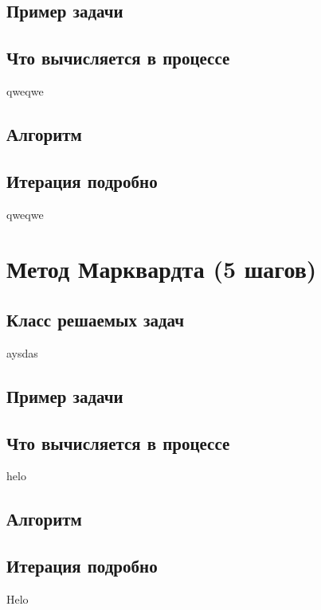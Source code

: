 \subsection{Пример задачи} %

\subsection{Что вычисляется в процессе}
qweqwe

\subsection{Алгоритм} %

\subsection{Итерация подробно} %
qweqwe

\section{Метод Марквардта (5 шагов)}

\subsection{Класс решаемых задач} %
aysdas

\subsection{Пример задачи} %

\subsection{Что вычисляется в процессе}
helo

\subsection{Алгоритм} %

\subsection{Итерация подробно} %
Helo
